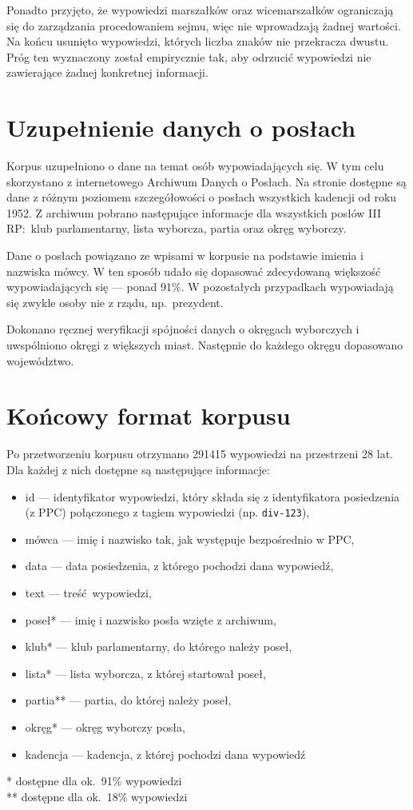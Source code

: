   Ponadto przyjęto, że wypowiedzi marszałków oraz wicemarszałków ograniczają się do zarządzania procedowaniem sejmu,
    więc nie wprowadzają żadnej wartości.
  Na końcu usunięto wypowiedzi, których liczba znaków nie przekracza dwustu.
  Próg ten wyznaczony został empirycznie tak, aby odrzucić wypowiedzi nie zawierające żadnej konkretnej informacji.

\section{Uzupełnienie danych o posłach}
  Korpus uzupełniono o dane na temat osób wypowiadających się.
  W tym celu skorzystano z internetowego Archiwum Danych o Posłach\cite{archiwum_posl}.
  Na stronie dostępne są dane z różnym poziomem szczegółowości o posłach wszystkich kadencji od roku 1952.
  Z archiwum pobrano następujące informacje dla wszystkich posłów III RP:\ klub parlamentarny, lista wyborcza, partia oraz okręg wyborczy.

  Dane o posłach powiązano ze wpisami w korpusie na podstawie imienia i nazwiska mówcy.
  W ten sposób udało się dopasować zdecydowaną większość wypowiadających się --- ponad 91\%.
  W pozostałych przypadkach wypowiadają się zwykle osoby nie z rządu, np.\ prezydent.

  Dokonano ręcznej weryfikacji spójności danych o okręgach wyborczych i uwspólniono okręgi z większych miast.
  Następnie do każdego okręgu dopasowano województwo.

\section{Końcowy format korpusu}
  Po przetworzeniu korpusu otrzymano 291415 wypowiedzi na przestrzeni 28 lat.
  Dla każdej z nich dostępne są następujące informacje:
  \begin{itemize}
    \item id --- identyfikator wypowiedzi, który składa się z identyfikatora posiedzenia (z PPC) połączonego z tagiem wypowiedzi (np. \verb|div-123|),
    \item mówca --- imię i nazwisko tak, jak występuje bezpośrednio w PPC,
    \item data --- data posiedzenia, z którego pochodzi dana wypowiedź,
    \item text --- treść wypowiedzi,
    \item poseł* --- imię i nazwisko posła wzięte z archiwum,
    \item klub* --- klub parlamentarny, do którego należy poseł,
    \item lista* --- lista wyborcza, z której startował poseł,
    \item partia** --- partia, do której należy poseł,
    \item okręg* --- okręg wyborczy posła,
    \item kadencja --- kadencja, z której pochodzi dana wypowiedź
  \end{itemize}
  \vspace{1em}
  * dostępne dla ok.~91\% wypowiedzi\\
  ** dostępne dla ok.~18\% wypowiedzi